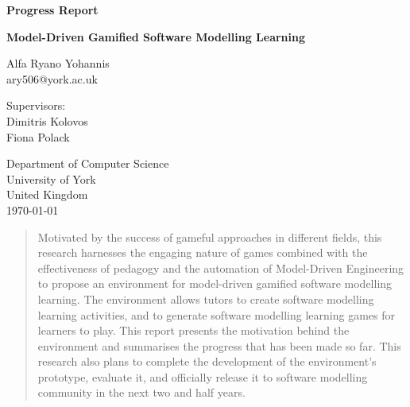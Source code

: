 \documentclass[12pt, a4paper]{report} \usepackage[titletoc]{appendix}
\begin{document}
\begin{titlepage}
 \begin{center}

\textbf{Progress Report}
\vspace{1cm}

\textbf{\large Model-Driven Gamified Software Modelling Learning}
\vspace{1cm}

Alfa Ryano Yohannis\\
ary506@york.ac.uk
\vspace{1cm}

Supervisors:\\
Dimitris Kolovos\\
Fiona Polack\\
\vspace{1cm}

Department of Computer Science\\
University of York\\
United Kingdom\\
\vspace{1cm}
\today
 
\vfill
 
\end{center}
\end{titlepage}


\begin{abstract}
Motivated by the success of gameful approaches in different fields, this research harnesses the engaging nature of games combined with the effectiveness of pedagogy and the automation of Model-Driven Engineering to propose an environment for model-driven gamified software modelling learning. The environment allows tutors to create software modelling learning activities, and to generate software modelling learning games for learners to play. This report presents the motivation behind the environment and summarises the progress that has been made so far. This research also plans to complete the development of the environment's prototype, evaluate it, and officially release it to software modelling community in the next two and half years.
\end{abstract}

\tableofcontents
{}

\listoffigures
\newpage
 
\listoftables
\newpage

\lstlistoflistings
\newpage
\end{document}
